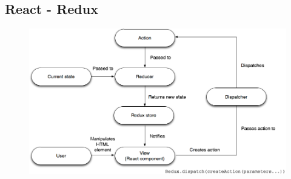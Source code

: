 \subsection {React - Redux}
\begin{figure}
  \begin{center}
    \includegraphics[width=\textwidth]{imagenes/react_redux.png}
    \caption{}
    \label{fig:}
  \end{center}
\end{figure}


  

